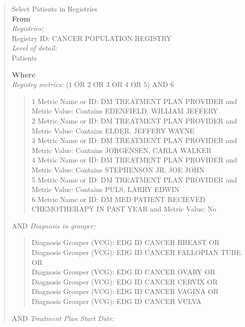 \documentclass[
]{book}
\begin{document}
\begin{quote}
Select Patients in Registries\\
\textbf{From}\\
\emph{Registries:}\\
Registry ID: CANCER POPULATION REGISTRY\\
\emph{Level of detail:}\\
Patients

\textbf{Where}\\
\emph{Registry metrics:} (1 OR 2 OR 3 OR 4 OR 5) AND 6\\

\begin{quote}
1 Metric Name or ID: DM TREATMENT PLAN PROVIDER and Metric Value: Contains EDENFIELD, WILLIAM JEFFERY\\
2 Metric Name or ID: DM TREATMENT PLAN PROVIDER and Metric Value: Contains ELDER, JEFFERY WAYNE\\
3 Metric Name or ID: DM TREATMENT PLAN PROVIDER and Metric Value: Contains JORGENSEN, CARLA WALKER\\
4 Metric Name or ID: DM TREATMENT PLAN PROVIDER and Metric Value: Contains STEPHENSON JR, JOE JOHN\\
5 Metric Name or ID: DM TREATMENT PLAN PROVIDER and Metric Value: Contains PULS, LARRY EDWIN\\
6 Metric Name or ID: DM MED PATIENT RECIEVED CHEMOTHERAPY IN PAST YEAR and Metric Value: No\\
\end{quote}

AND \emph{Diagnosis in grouper:}\\

\begin{quote}
Diagnosis Grouper (VCG): EDG ID CANCER BREAST OR\\
Diagnosis Grouper (VCG): EDG ID CANCER FALLOPIAN TUBE OR\\
Diagnosis Grouper (VCG): EDG ID CANCER OVARY OR\\
Diagnosis Grouper (VCG): EDG ID CANCER CERVIX OR\\
Diagnosis Grouper (VCG): EDG ID CANCER VAGINA OR\\
Diagnosis Grouper (VCG): EDG ID CANCER VULVA\\
\end{quote}

AND \emph{Treatment Plan Start Date:}\\


\end{quote}
\end{document}
